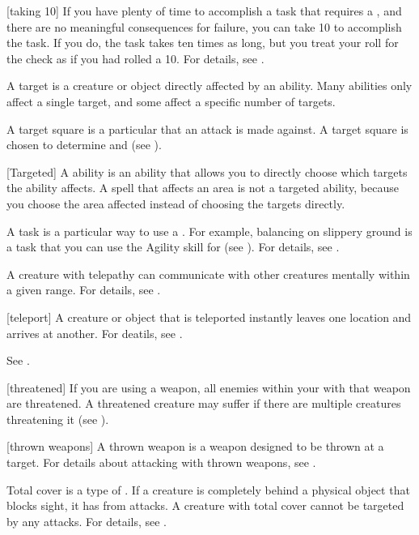 [taking 10] If you have plenty of time to accomplish a task that requires a , and there are no meaningful consequences for failure, you can take 10 to accomplish the task.
If you do, the task takes ten times as long, but you treat your roll for the check as if you had rolled a 10.
For details, see .

 A target is a creature or object directly affected by an ability.
Many abilities only affect a single target, and some affect a specific number of targets.

 A target square is a particular  that an attack is made against.
A target square is chosen to determine  and  (see ).

[Targeted] A  ability is an ability that allows you to directly choose which targets the ability affects.
A spell that affects an area is not a targeted ability, because you choose the area affected instead of choosing the targets directly.

 A task is a particular way to use a .
For example, balancing on slippery ground is a task that you can use the Agility skill for (see ).
For details, see .

 A creature with telepathy can communicate with other creatures mentally within a given range.
For details, see .

[teleport] A creature or object that is teleported instantly leaves one location and arrives at another.
For deatils, see .

 See .

[threatened] If you are using a  weapon, all enemies within your  with that weapon are threatened.
A threatened creature may suffer  if there are multiple creatures threatening it (see ).

[thrown weapons] A thrown weapon is a weapon designed to be thrown at a target.
For details about attacking with thrown weapons, see .

 Total cover is a type of .
If a creature is completely behind a physical object that blocks sight, it has  from attacks.
A creature with total cover cannot be targeted by any attacks.
For details, see .

